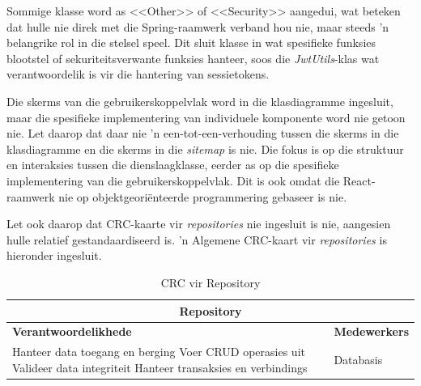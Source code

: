 Sommige klasse word as <<Other>> of <<Security>> aangedui, wat beteken dat hulle nie direk met die Spring-raamwerk verband hou nie, maar steeds 'n belangrike rol in die stelsel speel. Dit sluit klasse in wat spesifieke funksies blootstel of sekuriteitsverwante funksies hanteer, soos die \textit{JwtUtils}-klas wat verantwoordelik is vir die hantering van sessietokens.

Die skerms van die gebruikerskoppelvlak word in die klasdiagramme ingesluit,
maar die spesifieke implementering van individuele komponente word nie getoon
nie. Let daarop dat daar nie 'n een-tot-een-verhouding tussen die skerms in die
klasdiagramme en die skerms in die \textit{sitemap} is nie. Die fokus is op die
struktuur en interaksies tussen die dienslaagklasse, eerder as op die
spesifieke implementering van die gebruikerskoppelvlak. Dit is ook omdat die
React-raamwerk nie op objektgeoriënteerde programmering gebaseer is nie.

Let ook daarop dat CRC-kaarte vir \textit{repositories} nie ingesluit is nie,
aangesien hulle relatief gestandaardiseerd is. 'n Algemene CRC-kaart vir
\textit{repositories} is hieronder ingesluit.

\begin{table}[H]\centering\begin{tabular}{|p{}|p{}|}
    \hline
    \multicolumn{2}{|c|}{\textbf{Repository}} \\
    \hline
    \textbf{Verantwoordelikhede} & \textbf{Medewerkers} \\
    \hline
    Hanteer data toegang en berging \newline
    Voer CRUD operasies uit \newline
    Valideer data integriteit \newline
    Hanteer transaksies en verbindings
    &
    Databasis \\
    \hline
\end{tabular}
\caption{CRC vir Repository}
\label{tab:crc_repository}
\end{table}



\nopagebreak[4]

\nopagebreak[4]

\nopagebreak[4]

\nopagebreak[4]

\nopagebreak[4]

\nopagebreak[4]

\nopagebreak[4]

\nopagebreak[4]

\nopagebreak[4]